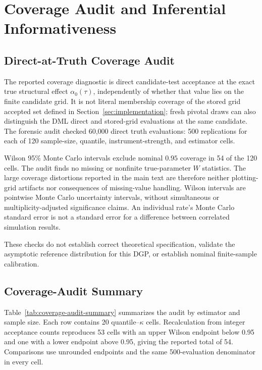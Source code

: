 \section{Coverage Audit and Inferential Informativeness}
\setcounter{equation}{0}\setcounter{table}{0}\setcounter{figure}{0}
\label{app:coverage-forensic-audit}

\subsection{Direct-at-Truth Coverage Audit}

The reported coverage diagnostic is direct candidate-test acceptance at the exact true structural effect $\alpha_0(\tau)$, independently of whether that value lies on the finite candidate grid. It is not literal membership coverage of the stored grid accepted set defined in Section~\ref{sec:implementation}; fresh pivotal draws can also distinguish the DML direct and stored-grid evaluations at the same candidate. The forensic audit checked 60,000 direct truth evaluations: 500 replications for each of 120 sample-size, quantile, instrument-strength, and estimator cells.

Wilson 95\% Monte Carlo intervals exclude nominal $0.95$ coverage in 54 of the 120 cells. The audit finds no missing or nonfinite true-parameter $W$ statistics. The large coverage distortions reported in the main text are therefore neither plotting-grid artifacts nor consequences of missing-value handling. Wilson intervals are pointwise Monte Carlo uncertainty intervals, without simultaneous or multiplicity-adjusted significance claims. An individual rate's Monte Carlo standard error is not a standard error for a difference between correlated simulation results.

These checks do not establish correct theoretical specification, validate the asymptotic reference distribution for this DGP, or establish nominal finite-sample calibration.

\subsection{Coverage-Audit Summary}

Table~\ref{tab:coverage-audit-summary} summarizes the audit by estimator and sample size. Each row contains 20 quantile--$\kappa$ cells. Recalculation from integer acceptance counts reproduces 53 cells with an upper Wilson endpoint below 0.95 and one with a lower endpoint above 0.95, giving the reported total of 54. Comparisons use unrounded endpoints and the same 500-evaluation denominator in every cell.

